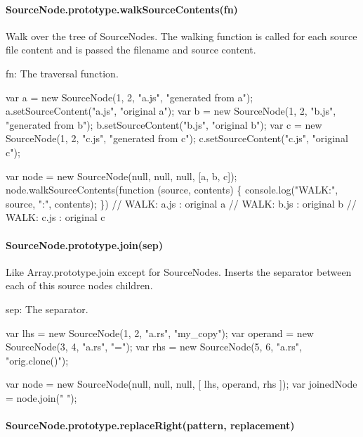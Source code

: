 \paragraph*{Source\+Node.\+prototype.\+walk\+Source\+Contents(fn)}

Walk over the tree of Source\+Nodes. The walking function is called for each source file content and is passed the filename and source content.


\begin{DoxyItemize}
\item {\ttfamily fn}\+: The traversal function.
\end{DoxyItemize}


\begin{DoxyCode}
var a = new SourceNode(1, 2, "a.js", "generated from a");
a.setSourceContent("a.js", "original a");
var b = new SourceNode(1, 2, "b.js", "generated from b");
b.setSourceContent("b.js", "original b");
var c = new SourceNode(1, 2, "c.js", "generated from c");
c.setSourceContent("c.js", "original c");

var node = new SourceNode(null, null, null, [a, b, c]);
node.walkSourceContents(function (source, contents) \{ console.log("WALK:", source, ":", contents); \})
// WALK: a.js : original a
// WALK: b.js : original b
// WALK: c.js : original c
\end{DoxyCode}


\paragraph*{Source\+Node.\+prototype.\+join(sep)}

Like {\ttfamily Array.\+prototype.\+join} except for Source\+Nodes. Inserts the separator between each of this source node\textquotesingle{}s children.


\begin{DoxyItemize}
\item {\ttfamily sep}\+: The separator.
\end{DoxyItemize}


\begin{DoxyCode}
var lhs = new SourceNode(1, 2, "a.rs", "my\_copy");
var operand = new SourceNode(3, 4, "a.rs", "=");
var rhs = new SourceNode(5, 6, "a.rs", "orig.clone()");

var node = new SourceNode(null, null, null, [ lhs, operand, rhs ]);
var joinedNode = node.join(" ");
\end{DoxyCode}


\paragraph*{Source\+Node.\+prototype.\+replace\+Right(pattern, replacement)}

